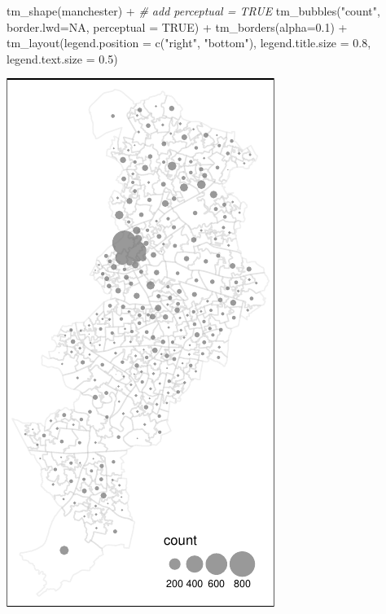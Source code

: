 \documentclass[
]{book}
\makeatletter
\newenvironment{Shaded}{\begin{snugshade}}{\end{snugshade}}
\newcommand{\AttributeTok}[1]{\textcolor[rgb]{0.61,0.61,0.61}{#1}}
\newcommand{\CommentTok}[1]{\textcolor[rgb]{0.37,0.37,0.37}{\textit{#1}}}
\newcommand{\ConstantTok}[1]{\textcolor[rgb]{0,0,0}{#1}}
\newcommand{\FloatTok}[1]{\textcolor[rgb]{0.06,0.06,0.06}{#1}}
\newcommand{\FunctionTok}[1]{\textcolor[rgb]{0,0,0}{#1}}
\newcommand{\NormalTok}[1]{#1}
\newcommand{\SpecialCharTok}[1]{\textcolor[rgb]{0,0,0}{#1}}
\newcommand{\StringTok}[1]{\textcolor[rgb]{0.5,0.5,0.5}{#1}}
\newenvironment{kframe}{%
\medskip{}
\setlength{\fboxsep}{.8em}
 \def\at@end@of@kframe{}%
 \ifinner\ifhmode%
  \def\at@end@of@kframe{\end{minipage}}%
  \begin{minipage}{\columnwidth}%
 \fi\fi%
 \def\FrameCommand##1{\hskip\@totalleftmargin \hskip-\fboxsep
 \colorbox{shadecolor}{##1}\hskip-\fboxsep
     \hskip-\linewidth \hskip-\@totalleftmargin \hskip\columnwidth}%
 \MakeFramed {\advance\hsize-\width
   \@totalleftmargin\z@ \linewidth\hsize
   \@setminipage}}%
 {\par\unskip\endMakeFramed%
 \at@end@of@kframe}
\renewenvironment{Shaded}{\begin{kframe}}{\end{kframe}}
\makeatother
\begin{document}
\begin{Shaded}
\begin{Highlighting}[]
\FunctionTok{tm\_shape}\NormalTok{(manchester) }\SpecialCharTok{+}  
  \CommentTok{\# add perceptual = TRUE}
  \FunctionTok{tm\_bubbles}\NormalTok{(}\StringTok{"count"}\NormalTok{, }\AttributeTok{border.lwd=}\ConstantTok{NA}\NormalTok{, }\AttributeTok{perceptual =} \ConstantTok{TRUE}\NormalTok{) }\SpecialCharTok{+} 
  \FunctionTok{tm\_borders}\NormalTok{(}\AttributeTok{alpha=}\FloatTok{0.1}\NormalTok{) }\SpecialCharTok{+}                           
  \FunctionTok{tm\_layout}\NormalTok{(}\AttributeTok{legend.position =} \FunctionTok{c}\NormalTok{(}\StringTok{"right"}\NormalTok{, }\StringTok{"bottom"}\NormalTok{), }
            \AttributeTok{legend.title.size =} \FloatTok{0.8}\NormalTok{,}
            \AttributeTok{legend.text.size =} \FloatTok{0.5}\NormalTok{)}
\end{Highlighting}
\end{Shaded}

\includegraphics{crime_mapping_files/figure-latex/unnamed-chunk-80-1.pdf}
\end{document}
